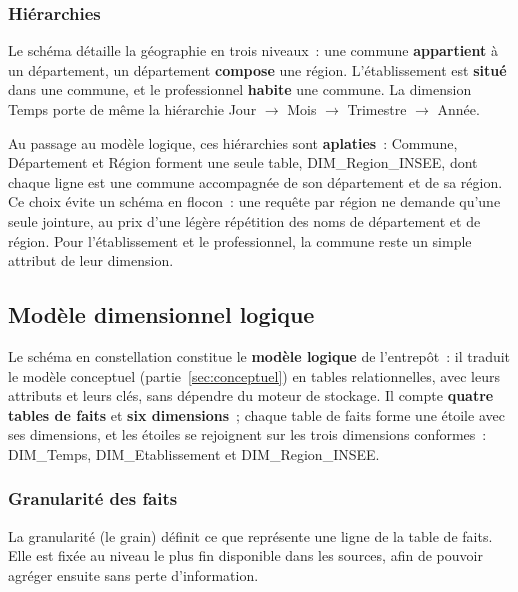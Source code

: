 \subsubsection*{Hiérarchies}

\noindent Le schéma détaille la géographie en trois niveaux~: une commune \textbf{appartient} à un département, un département \textbf{compose} une région. L'établissement est \textbf{situé} dans une commune, et le professionnel \textbf{habite} une commune. La dimension Temps porte de même la hiérarchie Jour $\rightarrow$ Mois $\rightarrow$ Trimestre $\rightarrow$ Année.

\vspace{0.2cm}

\noindent Au passage au modèle logique, ces hiérarchies sont \textbf{aplaties}~: Commune, Département et Région forment une seule table, DIM\_Region\_INSEE, dont chaque ligne est une commune accompagnée de son département et de sa région. Ce choix évite un schéma en flocon~: une requête par région ne demande qu'une seule jointure, au prix d'une légère répétition des noms de département et de région. Pour l'établissement et le professionnel, la commune reste un simple attribut de leur dimension.

\subsection{Modèle dimensionnel logique}\label{sec:logique}

\noindent Le schéma en constellation constitue le \textbf{modèle logique} de l'entrepôt~: il traduit le modèle conceptuel (partie~\ref{sec:conceptuel}) en tables relationnelles, avec leurs attributs et leurs clés, sans dépendre du moteur de stockage. Il compte \textbf{quatre tables de faits} et \textbf{six dimensions}~; chaque table de faits forme une étoile avec ses dimensions, et les étoiles se rejoignent sur les trois dimensions conformes~: DIM\_Temps, DIM\_Etablissement et DIM\_Region\_INSEE.

\subsubsection*{Granularité des faits}

\noindent La granularité (le \og grain\fg{}) définit ce que représente une ligne de la table de faits. Elle est fixée au niveau le plus fin disponible dans les sources, afin de pouvoir agréger ensuite sans perte d'information.

